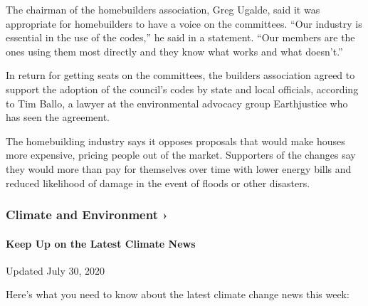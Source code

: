 The chairman of the homebuilders association, Greg Ugalde, said it was
appropriate for homebuilders to have a voice on the committees. ``Our
industry is essential in the use of the codes,'' he said in a statement.
``Our members are the ones using them most directly and they know what
works and what doesn't.''

In return for getting seats on the committees, the builders association
agreed to support the adoption of the council's codes by state and local
officials, according to Tim Ballo, a lawyer at the environmental
advocacy group Earthjustice who has seen the agreement.

The homebuilding industry says it opposes proposals that would make
houses more expensive, pricing people out of the market. Supporters of
the changes say they would more than pay for themselves over time with
lower energy bills and reduced likelihood of damage in the event of
floods or other disasters.

\href{https://www.nytimes3xbfgragh.onion/section/climate?action=click\&pgtype=Article\&state=default\&region=MAIN_CONTENT_1\&context=storylines_keepup}{}

\hypertarget{climate-and-environment-}{%
\subsubsection{Climate and Environment
›}\label{climate-and-environment-}}

\hypertarget{keep-up-on-the-latest-climate-news}{%
\paragraph{Keep Up on the Latest Climate
News}\label{keep-up-on-the-latest-climate-news}}

Updated July 30, 2020

Here's what you need to know about the latest climate change news this
week:


